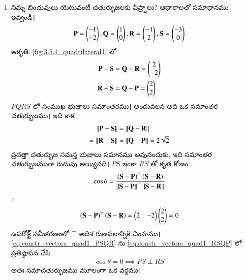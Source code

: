 %
\renewcommand{\theequation}{\theenumi}
\begin{enumerate}[label=\thesection.\arabic*.,ref=\thesection.\theenumi]


\item నిమ్న బిందువులు యెటువంటి చతుర్భుజలకు షిప్ర్షాలు? ఆధారాలతో సమాధానము ఇవ్వండి।
\begin{align}
\mathbf{P} = \begin{pmatrix}-1\\-2\end{pmatrix}, \mathbf{Q} =\begin{pmatrix}1\\0\end{pmatrix},
\mathbf{R} =\begin{pmatrix}-1\\2\end{pmatrix}, \mathbf{S} =\begin{pmatrix}-3\\0\end{pmatrix}
\end{align}
\solution
ఆకృతి.	\ref{fig:3.5.4_quadrilateral1} లో
\begin{align}
\label{eq:constr_vectors_quad1_PSQR}
 \mathbf{P} - \mathbf{S} &= 
 \mathbf{Q} - \mathbf{R} = \begin{pmatrix}2\\-2\end{pmatrix}
\\
\mathbf {R} - \mathbf {S} &=
 \mathbf {Q} - \mathbf {P} = \begin{pmatrix}2\\2\end{pmatrix}
\label{eq:constr_vectors_quad1_RSQP}
\end{align}
%
$PQRS$ లో  సంముఖ భుజాలు సమాంతరము। అందువలన అది ఒక సమాంతర చతుర్భుజము। ఇది కాక 
\begin{align}
\left\lVert \mathbf{P} - \mathbf{S}\right\rVert &= 
\left\lVert \mathbf{Q} - \mathbf{R}\right\rVert 
\\
=\left\lVert\mathbf {R} - \mathbf {S}\right\rVert &=
\left\lVert \mathbf {Q} - \mathbf {P}\right\rVert = 2\sqrt{2}
\end{align}
%
 ప్రదత్తా చతుర్భుజ సమస్త భుజాలు సమానము అవునందుకు, ఇది సమాంతర చతుర్భుజముగా రుదువు
అయ్యినది।   $PS$  ఇంకా 
$RS$  తో కృత కోణం
\begin{align}
\cos \theta = \frac{\left(\mathbf{S}-\mathbf{P}\right)^{\top}\left(\mathbf{S}-\mathbf{R}\right)}{\left\lVert\mathbf{S}-\mathbf{P}\right\rVert^{\top}\left\lVert\mathbf{S}-\mathbf{R}\right\rVert}
\end{align}
%
$\because $
\begin{align}
\left(\mathbf{S}-\mathbf{P}\right)^{\top}\left(\mathbf{S}-\mathbf{R}\right) = \begin{pmatrix}2 & -2\end{pmatrix}\begin{pmatrix}2\\2\end{pmatrix} = 0
\end{align}
ఉపరోక్ట్ సమీకరణంలో ${\top}$  అదిశ గుణఫలాన్నికి చింహము। 
\eqref{eq:constr_vectors_quad1_PSQR} ను  \eqref{eq:constr_vectors_quad1_RSQP} లో  
ప్రతిష్ఠాపన చేసి 
\begin{align}
\cos \theta = 0 \implies PS \perp RS
\end{align}
%
అతః సమాచతుర్భుజము  మూలంగా ఒక వర్గము। 
\begin{figure}[!ht]
	\centering

\end{figure}
\end{enumerate}
